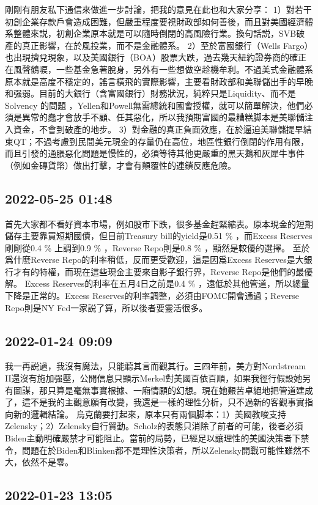 \documentclass[twocolumn]{ctexart}
\begin{document}
剛剛有朋友私下通信來做進一步討論，把我的意見在此也和大家分享：
1）對若干初創企業存款戶會造成困難，但嚴重程度要視財政部如何善後，而且對美國經濟體系整體來説，初創企業原本就是可以隨時倒閉的高風險行業。換句話説，SVB破產的真正影響，在於風投業，而不是金融體系。
2）至於富國銀行（Wells Fargo）也出現擠兌現象，以及美國銀行（BOA）股票大跌，過去幾天紐約證券商的確正在風聲鶴唳，一些基金急著脫身，另外有一些想做空趁機牟利。不過美式金融體系原本就是高度不穩定的，謠言橫飛的實際影響，主要看財政部和美聯儲出手的早晚和强弱。目前的大銀行（含富國銀行）財務狀況，純粹只是Liquidity、而不是Solvency 的問題 ，Yellen和Powell無需總統和國會授權，就可以簡單解決，他們必須是異常的蠢才會放手不顧、任其惡化，所以我預期富國的最糟糕脚本是美聯儲注入資金，不會到破產的地步。
3）對金融的真正負面效應，在於逼迫美聯儲提早結束QT；不過考慮到民間美元現金的存量仍在高位，地區性銀行倒閉的作用有限，而且引發的通脹惡化問題是慢性的，必須等待其他更嚴重的黑天鵝和灰犀牛事件（例如金磚貨幣）做出打擊，才會有顛覆性的連鎖反應危險。
\subsection*{2022-05-25 01:48}

首先大家都不看好資本市場，例如股市下跌，很多基金趕緊縮表。原本現金的短期儲存主要靠買短期國債，但目前Treasury bill的yield是0.51 \% ，而Excess Reserves剛剛從0.4 \% 上調到0.9 \% ，Reverse Repo則是0.8 \% ，顯然是較優的選擇。
至於爲什麽Reverse Repo的利率稍低，反而更受歡迎，這是因爲Excess Reserves是大銀行才有的特權，而現在這些現金主要來自影子銀行界，Reverse Repo是他們的最優解。
Excess Reserves的利率在五月4日之前是0.4 \% ，遠低於其他管道，所以總量下降是正常的。Excess Reserves的利率調整，必須由FOMC開會通過；Reverse Repo則是NY Fed一家説了算，所以後者要靈活很多。
\subsection*{2022-01-24 09:09}

我一再説過，我沒有魔法，只能聼其言而觀其行。三四年前，美方對Nordstream II還沒有施加强壓，公開信息只顯示Merkel對美國百依百順，如果我徑行假設她另有圖謀，那只算是毫無事實根據、一廂情願的幻想。現在她艱苦卓絕地把管道建成了，這不是我的主觀意願有改變，我還是一樣的理性分析，只不過新的客觀事實指向新的邏輯結論。
烏克蘭要打起來，原本只有兩個脚本：1）美國教唆支持Zelensky；2）Zelensky自行貿動。Scholz的表態只消除了前者的可能，後者必須Biden主動明確嚴禁才可能阻止。當前的局勢，已經足以讓理性的美國決策者下禁令，問題在於Biden和Blinken都不是理性決策者，所以Zelensky開戰可能性雖然不大，依然不是零。
\subsection*{2022-01-23 13:05}
\end{document}
